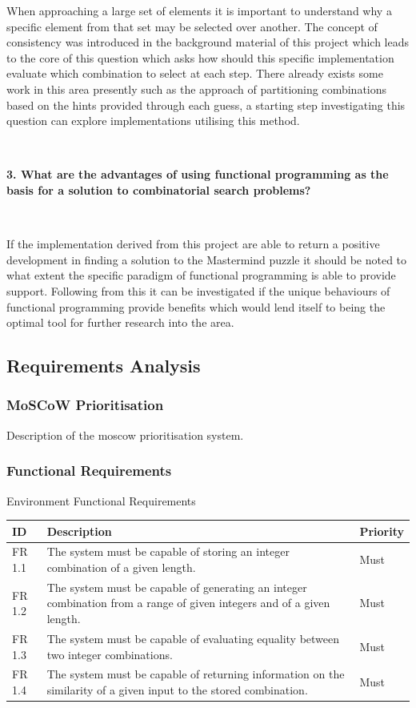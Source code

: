 \documentclass[12pt]{article}  %
\theoremstyle{definition}
\theoremstyle{remark}
\begin{document}
When approaching a large set of elements it is important to understand why a specific element from that set may be selected over another. The concept of consistency was introduced in the background material of this project which leads to the core of this question which asks how should this specific implementation evaluate which combination to select at each step. There already exists some work in this area presently such as the approach of partitioning combinations based on the hints provided through each guess, a starting step investigating this question can explore implementations utilising this method.

\

\textbf{3. What are the advantages of using functional programming as the basis for a solution to combinatorial search problems?}

\

If the implementation derived from this project are able to return a positive development in finding a solution to the Mastermind puzzle it should be noted to what extent the specific paradigm of functional programming is able to provide support. Following from this it can be investigated if the unique behaviours of functional programming provide benefits which would lend itself to being the optimal tool for further research into the area.
\subsection {Requirements Analysis}

\subsubsection {MoSCoW Prioritisation}

Description of the moscow prioritisation system.

\subsubsection {Functional Requirements}

Environment Functional Requirements

\begin{tabularx}{\textwidth}{|X|X|X|}
\hline
ID     & Description                                                                         & Priority \\ \hline
FR 1.1 & The system must be capable of storing an integer combination of a given length.     & Must     \\ \hline
FR 1.2 & The system must be capable of generating an integer combination from a range of given integers and of a given length. & Must \\ \hline
FR 1.3 & The system must be capable of evaluating equality between two integer combinations. & Must     \\ \hline
FR 1.4 & The system must be capable of returning information on the similarity of a given input to the stored combination.     & Must \\ \hline
\end{tabularx}
\end{document}
